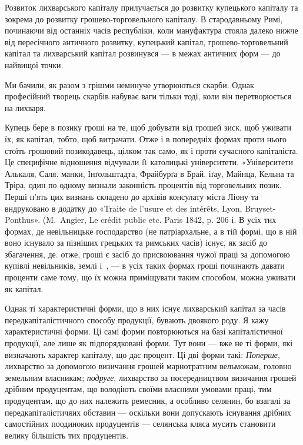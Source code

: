
Розвиток лихварського капіталу прилучається до розвитку купецького капіталу
та зокрема до розвитку грошево-торговельного капіталу. В стародавньому
Римі, починаючи від останніх часів республіки, коли мануфактура стояла далеко
нижче від пересічного античного розвитку, купецький капітал, грошево-торговельний
капітал та лихварський капітал розвинувся — в межах античних форм —
до найвищої точки.

Ми бачили, як разом з грішми неминуче утворюються скарби. Однак професійний
творець скарбів набуває ваги тільки тоді, коли він перетворюється на
лихваря.

Купець бере в позику гроші на те, щоб добувати від грошей зиск, щоб уживати
їх, як капітал, тобто, щоб витрачати. Отже і в попередніх формах проти
нього стоїть грошовий позикодавець, цілком так само, як і проти сучасного капіталіста.
Це специфічне відношення відчували ft католицькі університети. «Університети
Алькаля, Саля. манки, Інґольштадта, Фрайбурґа в Брай. іґау, Майнца, Кельна та
Тріра, один по одному визнали законність процентів від торговельних позик.
Перші п’ять цих визнань складено до архівів консулату міста Ліону та вндруковано
в додатку до «Traite de l’usure et des intérêts, Lyon, Bruyset-Ponthus».
(M.~Angier, Le crédit public etc. Paris 1842, p. 206 і. В усіх тих формах, де невільницьке
господарство (не патріархальне, а в тій формі, що в ній воно існувало
за пізніших грецьких та римських часів) існує, як засіб до збагачення,
де. отже, гроші є засіб до присвоювання чужої праці за допомогою купівлі невільників,
землі і~, — в усіх таких формах гроші починають давати проценти
саме тому, що їх можна приміщувати таким способом, можна уживати
як капітал.

Однак ті характеристичні форми, що в них існує лихварський капітал за
часів передкапіталістичного способу продукції, бувають двоякого роду. Я кажу
характеристичні форми. Ці самі форми повторюються на базі капіталістичної
продукції, але лише як підпорядковані форми. Тут вони — вже не ті форми, які
визначають характер капіталу, що дає процент. Ці дві форми такі: \emph{Поперше},
лихварство за допомогою визичання грошей марнотратним вельможам, головно
земельним власникам; \emph{подруге}, лихварство за посередництвом визичання грошей
дрібним продуцентам, що володіють своїми власними умовами праці, тим продуцентам,
що до них належить ремесник, а особливо селянин, бо взагалі за передкапіталістичяих
обставин — оскільки вони допускають існування дрібних самостійних
поодиноких продуцентів — селянська кляса мусить становити велику більшість
тих продуцентів.

